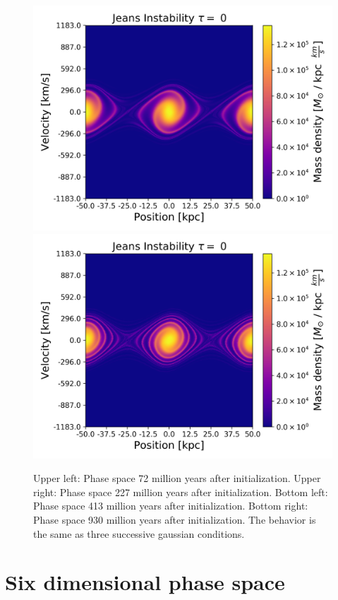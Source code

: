 \begin{figure}[h!]
    \includegraphics[scale=0.45]{imag/jeans40.png}
    \includegraphics[scale=0.45]{imag/jeans90.png}
    \caption{Upper left: Phase space 72 million years after initialization. Upper right: Phase space 227 million years after initialization. Bottom left: Phase space 413 million years after initialization. Bottom right: Phase space 930 million years after initialization. The behavior is the same as three successive gaussian conditions.}
    \label{1dJeans}
\end{figure}



\newpage
\section{Six dimensional phase space}










